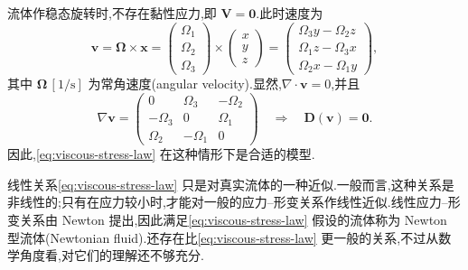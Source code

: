 \begin{example}[稳态旋转]\label{ex:steady-rotation}
流体作稳态旋转时,不存在黏性应力,即 $\bm{V}=\bm{0}$.此时速度为
\begin{equation*}
  \bm{v}=\symbf{\Omega}\times\bm{x}
  =\begin{pmatrix}\Omega_1\\\Omega_2\\\Omega_3\end{pmatrix}
   \times\begin{pmatrix}x\\y\\z\end{pmatrix}
  =\begin{pmatrix}
    \Omega_3y-\Omega_2z\\
    \Omega_1z-\Omega_3x\\
    \Omega_2x-\Omega_1y
  \end{pmatrix},
\end{equation*}
其中 $\symbf{\Omega}\,[1/\mathrm{s}]$ 为常角速度(angular velocity).显然,$\nabla\cdot\bm{v}=0$,并且
\begin{equation*}
  \nabla\bm{v}=
  \begin{pmatrix}
    0&\Omega_3&-\Omega_2\\
    -\Omega_3&0&\Omega_1\\
    \Omega_2&-\Omega_1&0
  \end{pmatrix}
  \quad\Longrightarrow\quad
  \bm{D}(\bm{v})=\bm{0}.
\end{equation*}
因此,\cref{eq:viscous-stress-law} 在这种情形下是合适的模型.
\end{example}

\begin{note}\label{note:newtonian-fluid}
线性关系\cref{eq:viscous-stress-law} 只是对真实流体的一种近似.一般而言,这种关系是非线性的;只有在应力较小时,才能对一般的应力--形变关系作线性近似.线性应力--形变关系由 Newton 提出,因此满足\cref{eq:viscous-stress-law} 假设的流体称为 Newton 型流体(Newtonian fluid).还存在比\cref{eq:viscous-stress-law} 更一般的关系,不过从数学角度看,对它们的理解还不够充分.
\end{note}

